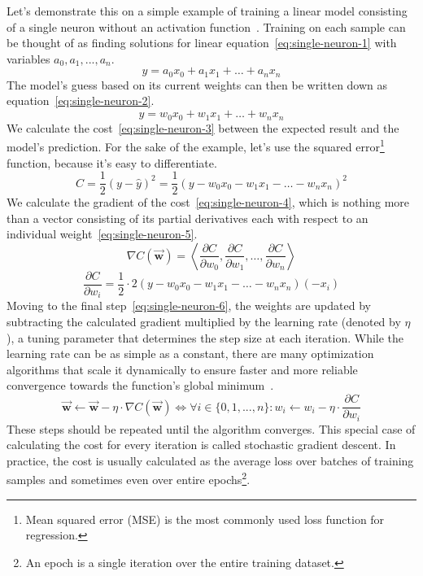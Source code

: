 Let's demonstrate this on a simple example of training a linear model consisting of a single
neuron without an activation function~\cite{sahu-power-of-single-neuron}. Training on each sample
can be thought of as finding solutions for linear equation~\eqref{eq:single-neuron-1}
with variables $a_0, a_1, ..., a_n$.
\begin{equation}
\label{eq:single-neuron-1}
    y = a_0 x_0 + a_1 x_1 + \dots + a_n x_n
\end{equation}
The model's guess based on its current weights can then be written down as equation~\eqref{eq:single-neuron-2}.
\begin{equation}
\label{eq:single-neuron-2}
    \hat{y} = w_0 x_0 + w_1 x_1 + \dots + w_n x_n
\end{equation}
We calculate the cost~\eqref{eq:single-neuron-3}
between the expected result and the model's prediction.
For the sake of the example, let's use the squared
error\footnote{Mean squared error (MSE) is the most commonly used loss function for regression.}
function, because it's easy to differentiate.
\begin{equation}
\label{eq:single-neuron-3}
    C = \frac{1}{2} (y - \hat{y})^2 = \frac{1}{2} (y - w_0 x_0 - w_1 x_1 - \dots - w_n x_n)^2
\end{equation}
We calculate the gradient of the cost~\eqref{eq:single-neuron-4},
which is nothing more than a vector consisting of its partial derivatives
each with respect to an individual weight~\eqref{eq:single-neuron-5}.
\begin{equation}
\label{eq:single-neuron-4}
    \nabla C(\vec{\boldsymbol{w}}) = \left\langle \frac{\partial C}{\partial w_0}, \frac{\partial C}{\partial w_1},
    \dots, \frac{\partial C}{\partial w_n} \right\rangle
\end{equation}
\begin{equation}
\label{eq:single-neuron-5}
    \frac{\partial C}{\partial w_i} = \frac{1}{2} \cdot 2 (y - w_0 x_0 - w_1 x_1 - \dots - w_n x_n) (-x_i)
\end{equation}
Moving to the final step~\eqref{eq:single-neuron-6},
the weights are updated by subtracting the calculated gradient multiplied by
the learning rate (denoted by $\eta$), a tuning parameter that determines the step size at
each iteration. While the learning rate can be as simple as a constant, there are
many optimization algorithms that scale it dynamically to
ensure faster and more reliable convergence towards the function's global minimum~\cite{ruder2016overview}.
\begin{equation}
\label{eq:single-neuron-6}
    \vec{\boldsymbol{w}} \leftarrow \vec{\boldsymbol{w}} - \eta \cdot \nabla C(\vec{\boldsymbol{w}})
    \Longleftrightarrow
    \forall i \in \{0,1,...,n\}:
    w_i \leftarrow w_i - \eta \cdot \frac{\partial C}{\partial w_i}
\end{equation}
These steps should be repeated until the algorithm converges.
This special case of calculating the cost for every iteration is called stochastic gradient descent.
In practice, the cost is usually calculated as the average loss over batches of training samples and sometimes even over entire epochs\footnote{An epoch is a single iteration over the entire training dataset.}.


